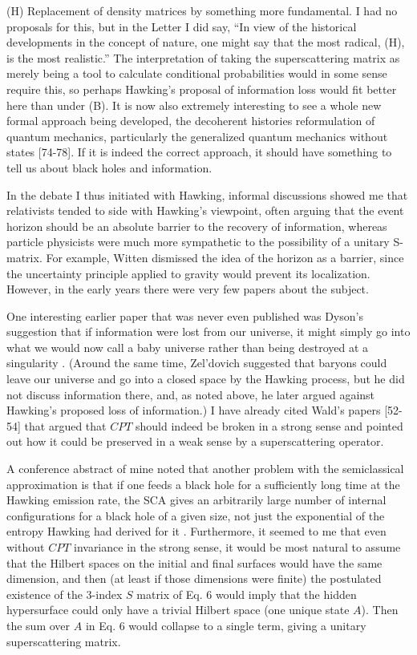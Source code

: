      (H) Replacement of density matrices by something more
fundamental.  I had
no proposals for this, but in the Letter I did say, ``In view of the
historical
developments in the concept of nature, one might say that the most
radical,
(H), is the most realistic.''  The interpretation of taking the
superscattering
matrix as merely being a tool to calculate conditional probabilities
would in
some sense require this, so perhaps Hawking's proposal of information
loss
would fit better here than under (B).  It is now also extremely
interesting to
see a whole new formal approach being developed, the decoherent
histories
reformulation of quantum mechanics, particularly the generalized
quantum
mechanics without states [74-78].  If it is indeed the
correct approach, it should have something to tell us about black
holes and
information.

     In the debate I thus initiated with Hawking, informal
discussions showed
me that relativists tended to side with Hawking's viewpoint, often
arguing that
the event horizon should be an absolute barrier to the recovery of
information,
whereas particle physicists were much more sympathetic to the
possibility of a
unitary S-matrix.  For example, Witten \cite{Wit81pri} dismissed the
idea of
the horizon as a barrier, since the uncertainty principle applied to
gravity
would prevent its localization.  However, in the early years there
were very
few papers about the subject.

     One interesting earlier paper that was never even published was
Dyson's
suggestion that if information were lost from our universe, it might
simply go
into what we would now call a baby universe rather than being
destroyed at a
singularity \cite{Dys76}.  (Around the same time, Zel'dovich
\cite{Zel77a}
suggested that baryons could leave our universe and go into a closed
space by
the Hawking process, but he did not discuss information there, and,
as noted
above, he later argued \cite{Zel77b} against Hawking's proposed loss
of information.)  I have already cited Wald's papers [52-54]
that argued that $CPT$ should indeed be broken in a strong sense and
pointed
out how it could be preserved in a weak sense by a superscattering
operator.

    A conference abstract of mine \cite{Pag80b} noted that another
problem
with
the semiclassical approximation is that if one feeds a black hole for
a
sufficiently long time at the Hawking emission rate, the SCA gives an
arbitrarily
large number of internal configurations for a black hole of a given
size, not
just
the exponential of the entropy Hawking had derived for it
\cite{Haw75,Haw76a}.
Furthermore, it seemed to me that even without $CPT$ invariance in
the strong
sense, it would be most natural to assume that the Hilbert spaces on
the
initial and final surfaces would have the same dimension, and then
(at least if
those dimensions were finite) the postulated existence of the 3-index
$S$
matrix of Eq. 6 would imply that the hidden hypersurface could only
have a
trivial Hilbert space (one unique state $A$).  Then the sum over $A$
in Eq. 6
would collapse to a single term, giving a unitary superscattering
matrix.

